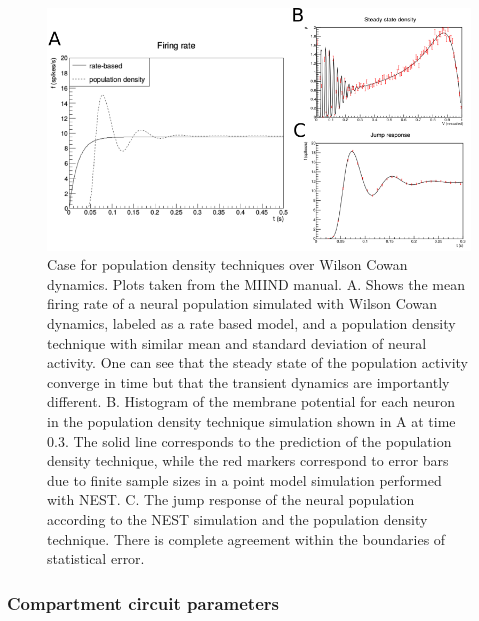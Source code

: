 \documentclass[10pt]{article}
\begin{document}
\begin{figure}[h!]
\begin{center}
\includegraphics[width=0.70\columnwidth]{figures/case_for_pdt1/case_for_pdt1}
\caption{{\label{pdt_case} Case for population density techniques over Wilson
Cowan dynamics.
Plots taken from the MIIND manual. A. Shows the mean firing rate of a
neural population simulated with Wilson Cowan dynamics, labeled as a
rate based model, and a population density technique with similar mean
and standard deviation of neural activity. One can see that the steady
state of the population activity converge in time but that the transient
dynamics are importantly different. B. Histogram of the membrane
potential for each neuron in the population density technique simulation
shown in A at time 0.3. The solid line corresponds to the prediction of
the population density technique, while the red markers correspond to
error bars due to finite sample sizes in a point model simulation
performed with NEST. C. The jump response of the neural population
according to the NEST simulation and the population density technique.
There is complete agreement within the boundaries of statistical error.%
}}
\end{center}
\end{figure}

\subsubsection{Compartment circuit
parameters}\label{compartment-circuit-parameters}
\end{document}
